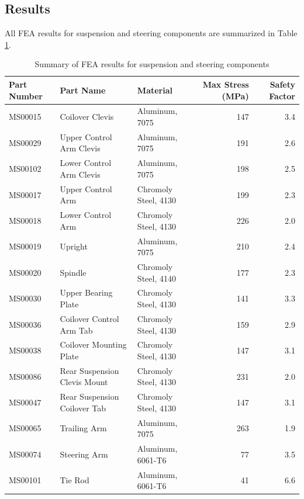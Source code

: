 \documentclass[10pt]{article}
\begin{document}
\subsection{Results}
All FEA results for suspension and steering components are summarized in Table \ref{tab:fea-results-suspension-steering}.

\begin{table}[H]
\centering
\begin{tabular}{lllrr}
\toprule
Part Number & Part Name                    & Material             & Max Stress (\si{\mega\pascal}) & Safety Factor \\
\midrule
MS00015     & Coilover Clevis              & Aluminum, 7075       &                 147 &           3.4 \\
MS00029     & Upper Control Arm Clevis     & Aluminum, 7075       &                 191 &           2.6 \\
MS00102     & Lower Control Arm Clevis     & Aluminum, 7075       &                 198 &           2.5 \\
MS00017     & Upper Control Arm            & Chromoly Steel, 4130 &                 199 &           2.3 \\
MS00018     & Lower Control Arm            & Chromoly Steel, 4130 &                 226 &           2.0 \\
MS00019     & Upright                      & Aluminum, 7075       &                 210 &           2.4 \\
MS00020     & Spindle                      & Chromoly Steel, 4140 &                 177 &           2.3 \\
MS00030     & Upper Bearing Plate          & Chromoly Steel, 4130 &                 141 &           3.3 \\
MS00036     & Coilover Control Arm Tab     & Chromoly Steel, 4130 &                 159 &           2.9 \\
MS00038     & Coilover Mounting Plate      & Chromoly Steel, 4130 &                 147 &           3.1 \\
MS00086     & Rear Suspension Clevis Mount & Chromoly Steel, 4130 &                 231 &           2.0 \\
MS00047     & Rear Suspension Coilover Tab & Chromoly Steel, 4130 &                 147 &           3.1 \\
MS00065     & Trailing Arm                 & Aluminum, 7075       &                 263 &           1.9 \\
MS00074     & Steering Arm                 & Aluminum, 6061-T6    &                  77 &           3.5 \\
MS00101     & Tie Rod                      & Aluminum, 6061-T6    &                  41 &           6.6 \\
\bottomrule
\end{tabular}
\caption{Summary of FEA results for suspension and steering components}
\label{tab:fea-results-suspension-steering}
\end{table}
\end{document}
